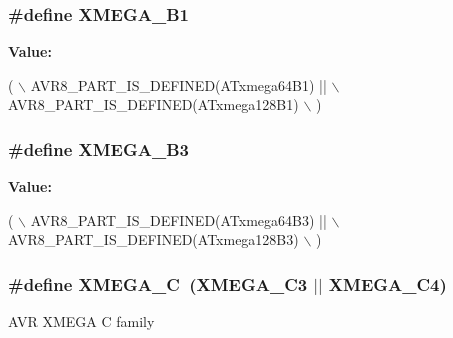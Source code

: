 \subsubsection[{X\+M\+E\+G\+A\+\_\+\+B1}]{\setlength{\rightskip}{0pt plus 5cm}\#define X\+M\+E\+G\+A\+\_\+\+B1}\label{group__xmega__part__macros__group_gaa2fd55860a1bbc05c6d0d384e7476596}
{\bfseries Value\+:}
\begin{DoxyCode}
( \(\backslash\)
        AVR8\_PART\_IS\_DEFINED(ATxmega64B1)  || \(\backslash\)
        AVR8\_PART\_IS\_DEFINED(ATxmega128B1) \(\backslash\)
        )
\end{DoxyCode}
\hypertarget{group__xmega__part__macros__group_ga7385be70af05a3a61864a4fc470fa39d}{}
\subsubsection[{X\+M\+E\+G\+A\+\_\+\+B3}]{\setlength{\rightskip}{0pt plus 5cm}\#define X\+M\+E\+G\+A\+\_\+\+B3}\label{group__xmega__part__macros__group_ga7385be70af05a3a61864a4fc470fa39d}
{\bfseries Value\+:}
\begin{DoxyCode}
( \(\backslash\)
        AVR8\_PART\_IS\_DEFINED(ATxmega64B3)  || \(\backslash\)
        AVR8\_PART\_IS\_DEFINED(ATxmega128B3) \(\backslash\)
        )
\end{DoxyCode}
\hypertarget{group__xmega__part__macros__group_ga75b06dd59d29b1de54dd73fe67830973}{}
\subsubsection[{X\+M\+E\+G\+A\+\_\+\+C}]{\setlength{\rightskip}{0pt plus 5cm}\#define X\+M\+E\+G\+A\+\_\+\+C~(X\+M\+E\+G\+A\+\_\+\+C3 $\vert$$\vert$ X\+M\+E\+G\+A\+\_\+\+C4)}\label{group__xmega__part__macros__group_ga75b06dd59d29b1de54dd73fe67830973}
A\+V\+R X\+M\+E\+G\+A C family \hypertarget{group__xmega__part__macros__group_ga10c26d10c3df7d9874e4527d1327c60b}{}
